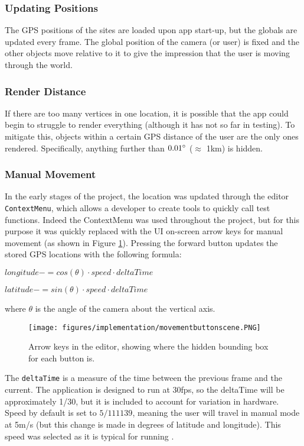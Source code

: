 \documentclass{article}
\begin{document}
\subsubsection{Updating Positions}
The GPS positions of the sites are loaded upon app start-up, but the globals are updated every frame. The global position of the camera (or user) is fixed and the other objects move relative to it to give the impression that the user is moving through the world. 

\subsubsection{Render Distance}
If there are too many vertices in one location, it is possible that the app could begin to struggle to render everything (although it has not so far in testing). To mitigate this, objects within a certain GPS distance of the user are the only ones rendered. Specifically, anything further than $0.01\degree$ ($\approx$ 1km) is hidden.

\subsubsection{Manual Movement}
In the early stages of the project, the location was updated through the editor \verb|ContextMenu|, which allows a developer to create tools to quickly call test functions. Indeed the ContextMenu was used throughout the project, but for this purpose it was quickly replaced with the UI on-screen arrow keys for manual movement (as shown in Figure \ref{fig:manualmovement}). Pressing the forward button updates the stored GPS locations with the following formula:

\hspace{1cm} $longitude -= cos(\theta) \cdot speed \cdot deltaTime$

\hspace{1cm} $latitude -= sin(\theta) \cdot speed \cdot deltaTime$

where $\theta$ is the angle of the camera about the vertical axis.

\begin{figure}[]
    \centering
    \texttt{[image: figures/implementation/movementbuttonscene.PNG]}
        \caption{Arrow keys in the editor, showing where the hidden bounding box for each button is.}
        \label{fig:manualmovement}
\end{figure}

The \verb|deltaTime| is a measure of the time between the previous frame and the current. The application is designed to run at 30fps, so the deltaTime will be approximately 1/30, but it is included to account for variation in hardware. Speed by default is set to $5/111139$, meaning the user will travel in manual mode at 5m/s (but this change is made in degrees of latitude and longitude). This speed was selected as it is typical for running \cite{movement:runningspeed}.
\end{document}
